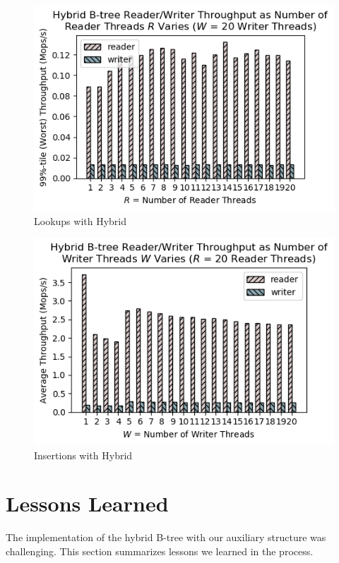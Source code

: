 \documentclass[twocolumn]{article}
\begin{document}
\begin{figure}[ht]
    \centering \includegraphics[width=\columnwidth]{figures/hybrid_w20_r1-20_99.png}
    \caption{Lookups with Hybrid \label{fig:hylookup}}
\end{figure}

\begin{figure}[ht]
    \centering \includegraphics[width=\columnwidth]{figures/hybrid_r20_w1-20_avg.png}
    \caption{Insertions with Hybrid \label{fig:hyinsert}}
\end{figure}


\section{Lessons Learned}

The implementation of the hybrid B-tree with our auxiliary structure was
challenging. This section summarizes lessons we learned in the process.
\end{document}

